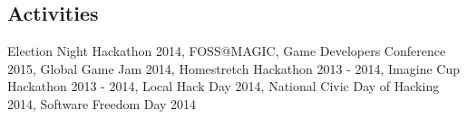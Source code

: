 \documentclass[line,margin]{res}
\begin{document}
\begin{resume}
\section{Activities}
Election Night Hackathon 2014, FOSS@MAGIC, Game Developers Conference 2015,
Global Game Jam 2014, Homestretch Hackathon 2013 - 2014, Imagine Cup Hackathon 2013 - 2014,
Local Hack Day 2014, National Civic Day of Hacking 2014, Software Freedom Day 2014



\end{resume}
\end{document}
